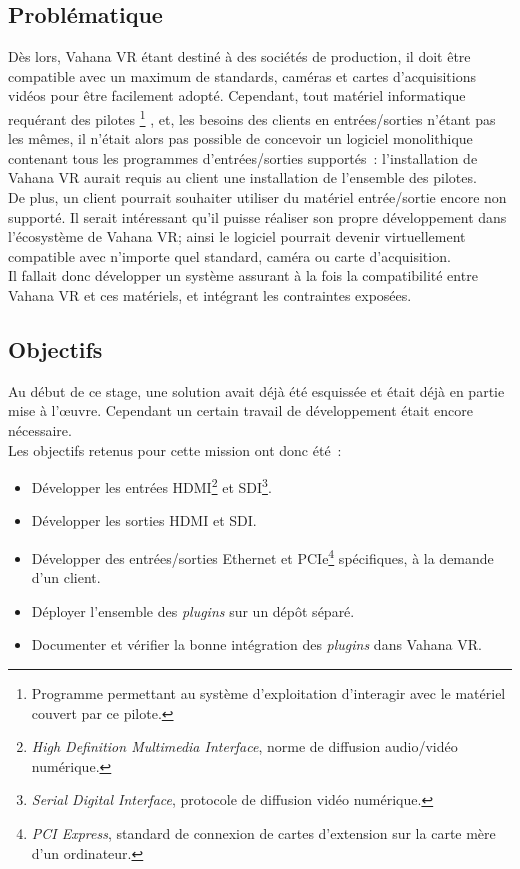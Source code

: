 \subsection{Problématique}
Dès lors, Vahana VR étant destiné à des sociétés de production, il doit
être compatible avec un maximum de standards, caméras et cartes d'acquisitions vidéos
pour être facilement adopté. Cependant, tout matériel informatique requérant des pilotes
\footnote{Programme permettant au système d'exploitation d'interagir avec le matériel couvert par ce pilote\cite{pilote-informatique}.}
, et, les besoins des clients en entrées/sorties n'étant pas les mêmes, il n'était
alors pas possible de concevoir un logiciel monolithique contenant tous les programmes 
d'entrées/sorties supportés~: l'installation de Vahana VR aurait requis au client 
une installation de l'ensemble des pilotes.\\
De plus, un client pourrait souhaiter utiliser du matériel entrée/sortie encore
non supporté. Il serait intéressant qu'il puisse réaliser son propre développement
dans l'écosystème de Vahana VR; ainsi le logiciel pourrait devenir virtuellement
compatible avec n'importe quel standard, caméra ou carte d'acquisition.\\
Il fallait donc développer un système assurant à la fois la compatibilité
entre Vahana VR et ces matériels, et intégrant les contraintes exposées.\\

\subsection{Objectifs}
Au début de ce stage, une solution avait déjà été esquissée et était déjà en partie
mise à l'\oe uvre. Cependant un certain travail de développement était encore nécessaire.\\
\newline
Les objectifs retenus pour cette mission ont donc été~:
\begin{itemize}
  \item Développer les entrées HDMI\footnote{\textit{High Definition Multimedia Interface}, 
  norme de diffusion audio/vidéo numérique\cite{hdmi}.} et SDI\footnote{\textit{Serial Digital Interface}, 
  protocole de diffusion vidéo numérique\cite{sdi}.}.
  \item Développer les sorties HDMI et SDI.
  \item Développer des entrées/sorties Ethernet et PCIe\footnote{\textit{PCI Express}, standard
  de connexion de cartes d'extension sur la carte mère d'un ordinateur\cite{pci-express}.}
  spécifiques, à la demande d'un client.
  \item Déployer l'ensemble des \textit{plugins} sur un dépôt séparé.
  \item Documenter et vérifier la bonne intégration des \textit{plugins} dans Vahana VR.
\end{itemize}

